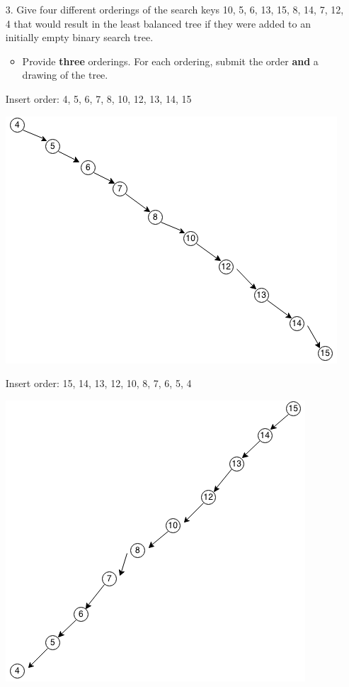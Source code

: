 \documentclass[10pt]{article}
\begin{document}
\begin{enumerate}
	\item[3.] Give four different orderings of the search keys 10, 5, 6, 13, 15, 8, 14, 7, 12, 4 that would result in the least balanced tree if they were added to an initially empty binary search tree.
		\begin{itemize}
			\item Provide \textbf{three} orderings. For each ordering, submit the order \textbf{and} a drawing of the tree.
		\end{itemize}
		
		\vspace{0.5cm}
		Insert order: 4, 5, 6, 7, 8, 10, 12, 13, 14, 15
		
		\vspace{0.5cm}
		\includegraphics[scale=0.5]{images/27_3_1.png}
		
		\vspace{0.5cm}
		Insert order: 15, 14, 13, 12, 10, 8, 7, 6, 5, 4
		
		\vspace{0.5cm}
		\includegraphics[scale=0.5]{images/27_3_2.png}
		

\end{enumerate}
\end{document}
